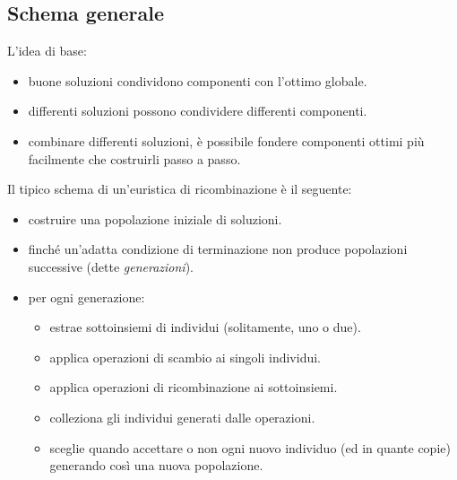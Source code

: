 \documentclass{article}
\begin{document}
\subsection{Schema generale}
L'idea di base:
\begin{itemize}
    \item buone soluzioni condividono componenti con l'ottimo globale.
    \item differenti soluzioni possono condividere differenti componenti.
    \item combinare differenti soluzioni, è possibile fondere componenti ottimi più facilmente
    che costruirli passo a passo.
\end{itemize}
Il tipico schema di un'euristica di ricombinazione è il seguente:
\begin{itemize}
    \item costruire una popolazione iniziale di soluzioni.
    \item finché un'adatta condizione di terminazione non produce popolazioni
    successive (dette \textit{generazioni}).
    \item per ogni generazione:
    \begin{itemize}
        \item estrae sottoinsiemi di individui (solitamente, uno o due).
        \item applica operazioni di scambio ai singoli individui.
        \item applica operazioni di ricombinazione ai sottoinsiemi.
        \item colleziona gli individui generati dalle operazioni.
        \item sceglie quando accettare o non ogni nuovo individuo (ed in quante copie)
        generando così una nuova popolazione.
    \end{itemize}
\end{itemize}
\end{document}
